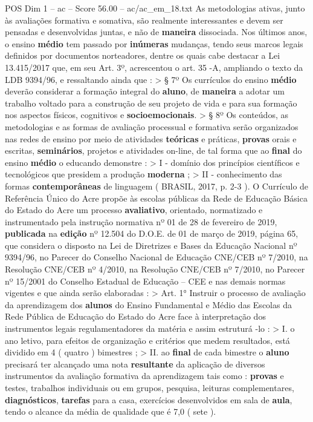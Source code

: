 \begin{textsample}{POS Dim 1 – ac – Score 56.00 – ac/ac\_em\_18.txt}
As metodologias ativas, junto às avaliações formativa e somativa, são realmente interessantes e devem ser pensadas e desenvolvidas juntas, e não de \textbf{maneira} dissociada.
Nos últimos anos, o ensino \textbf{médio} tem passado por \textbf{inúmeras} mudanças, tendo seus marcos legais definidos por documentos norteadores, dentre os quais cabe destacar a Lei 13.415/2017 que, em seu Art. 3º, acrescentou o art. 35 -A, ampliando o texto da LDB 9394/96, e ressaltando ainda que : > § 7º Os currículos do ensino \textbf{médio} deverão considerar a formação integral do \textbf{aluno}, de \textbf{maneira} a adotar um trabalho voltado para a construção de seu projeto de vida e para sua formação nos aspectos físicos, cognitivos e \textbf{socioemocionais}. > § 8º Os conteúdos, as metodologias e as formas de avaliação processual e formativa serão organizados nas redes de ensino por meio de atividades \textbf{teóricas} e práticas, \textbf{provas} orais e escritas, \textbf{seminários}, projetos e atividades on-line, de tal forma que ao \textbf{final} do ensino \textbf{médio} o educando demonstre : > I - domínio dos princípios científicos e tecnológicos que presidem a produção \textbf{moderna} ; > II - conhecimento das formas \textbf{contemporâneas} de linguagem ( BRASIL, 2017, p. 2-3 ).
O Currículo de Referência Único do Acre propõe às escolas públicas da Rede de Educação Básica do Estado do Acre um processo \textbf{avaliativo}, orientado, normatizado e instrumentado pela instrução normativa nº 01 de 28 de fevereiro de 2019, \textbf{publicada} na \textbf{edição} nº 12.504 do D.O.E. de 01 de março de 2019, página 65, que considera o disposto na Lei de Diretrizes e Bases da Educação Nacional nº 9394/96, no Parecer do Conselho Nacional de Educação CNE/CEB nº 7/2010, na Resolução CNE/CEB nº 4/2010, na Resolução CNE/CEB nº 7/2010, no Parecer nº 15/2001 do Conselho Estadual de Educação – CEE e nas demais normas vigentes e que ainda serão elaboradas : > Art. 1{\EmojiFont °} Instruir o processo de avaliação da aprendizagem dos \textbf{alunos} do Ensino Fundamental e Médio das Escolas da Rede Pública de Educação do Estado do Acre face à interpretação dos instrumentos legais regulamentadores da matéria e assim estruturá -lo : > I. o ano letivo, para efeitos de organização e critérios que medem resultados, está dividido em 4 ( quatro ) bimestres ; > II. ao \textbf{final} de cada bimestre o \textbf{aluno} precisará ter alcançado uma nota \textbf{resultante} da aplicação de diversos instrumentos da avaliação formativa da aprendizagem tais como : \textbf{provas} e testes, trabalhos individuais ou em grupos, pesquisa, leituras complementares, \textbf{diagnósticos}, \textbf{tarefas} para a casa, exercícios desenvolvidos em sala de \textbf{aula}, tendo o alcance da média de qualidade que é 7,0 ( sete ).

\end{textsample}
